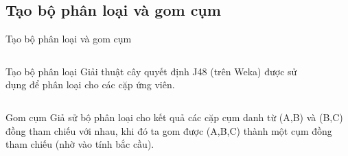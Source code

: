 \documentclass[9pt,xcolor=table]{beamer}
\begin{document}
	\subsection{Tạo bộ phân loại và gom cụm}
	\begin{frame}{Tạo bộ phân loại và gom cụm}		
		\begin{columns}[t]
			\begin{column}{0.4\textwidth}
			   	\begin{block}{Tạo bộ phân loại}
					Giải thuật cây quyết định J48 (trên Weka) được sử dụng để phân loại cho các cặp ứng viên.
				\end{block}				
			\end{column}
			\begin{column}{0.6\textwidth}  %
			 	\begin{figure}[H]
					\LARGE 
					\centering				
					\resizebox{65mm}{!}{}	
				\end{figure}
			\end{column}
		\end{columns}
		\begin{columns}[t]
			\begin{column}{\textwidth}
			   	\begin{block}{Gom cụm}
			   		Giả sử bộ phân loại cho kết quả các cặp cụm danh từ (A,B) và (B,C) đồng tham chiếu với nhau, khi đó ta gom được (A,B,C) thành một cụm đồng tham chiếu (nhờ vào tính bắc cầu).			
				\end{block}					
			\end{column}			
		\end{columns}
	\end{frame}
\end{document}
